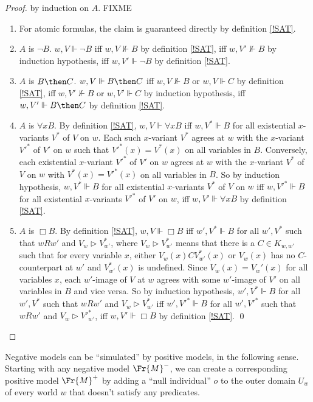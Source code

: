 \documentclass[11pt]{woarticle}
\theoremstyle{break}
\theoremstyle{nonumberplain}
\newcommand{\SAT}{\Vdash}
\newcommand{\Img}{\triangleright}
\newcommand{\1}{\;\,|\;\,}
\begin{document}
\begin{proof}
  by induction on $A$. 
  FIXME
  \begin{enumerate}
  \item For atomic formulas, the claim is guaranteed directly by
    definition \ref{!SAT}.
  \item $A$ is $\neg B$.\; $w,V \SAT \neg B$ iff $w,V \not\SAT B$ by
    definition \ref{!SAT}, iff $w,V' \not\SAT B$ by induction
    hypothesis, iff $w,V' \SAT \neg B$ by definition \ref{!SAT}.
  \item $A$ is $B \then C$.\; $w,V \SAT B \then C$ iff $w,V \not\SAT
    B$ or $w,V \SAT C$ by definition \ref{!SAT}, iff $w,V' \not\SAT B$
    or $w,V' \SAT C$ by induction hypothesis, iff $w,V' \SAT B \then
    C$ by definition \ref{!SAT}.
  \item $A$ is $\forall x B$.\; By definition \ref{!SAT}, $w,V \SAT
    \forall x B$ iff $w,V^* \SAT B$ for all existential $x$-variants
    $V^*$ of $V$ on $w$. Each such $x$-variant $V^*$ agrees at $w$
    with the $x$-variant ${V'}^*$ of $V'$ on $w$ such that ${V'}^*(x)
    = V^*(x)$ on all variables in $B$. Conversely, each existential
    $x$-variant ${V'}^*$ of $V'$ on $w$ agrees at $w$ with the
    $x$-variant $V^*$ of $V$ on $w$ with $V^*(x) = {V'}^*(x)$ on all
    variables in $B$. So by induction hypothesis, $w,V^* \SAT B$ for
    all existential $x$-variants $V^*$ of $V$ on $w$ iff $w,{V'}^*
    \SAT B$ for all existential $x$-variants ${V'}^*$ of $V'$ on $w$,
    iff $w,V' \SAT \forall x B$ by definition \ref{!SAT}.
  \item $A$ is $\Box B$.\; By definition \ref{!SAT}, $w,V \SAT \Box B$
    iff $w',V^* \SAT B$ for all $w',V^*$ such that $wRw'$ and $V_w\Img
    V^*_{w'}$, where $V_w\Img V^*_{w'}$ means that there is a $C \in
    K_{w,w'}$ such that for every variable $x$, either
    $V_w(x)CV_{w'}^*(x)$ or $V_w(x)$ has no $C$-counterpart at $w'$
    and $V_{w'}^*(x)$ is undefined. Since $V_w(x) = V_w'(x)$ for all
    variables $x$, each $w'$-image of $V$ at $w$ agrees with some
    $w'$-image of $V'$ on all variables in $B$ and vice versa. So by
    induction hypothesis, $w',V^* \SAT B$ for all $w',V^*$ such that
    $wRw'$ and $V_w \Img V^*_{w'}$ iff $w',{V'}^* \SAT B$ for all
    $w',{V'}^*$ such that $wRw'$ and $V_w \Img {V'}^*_{w'}$, iff $w,V'
    \SAT \Box B$ by definition \ref{!SAT}. \qed
  \end{enumerate}
\end{proof}

Negative models can be ``simulated'' by positive models, in the following sense.
Starting with any negative model $\Fr{M}^{-}$, we can create a corresponding
positive model $\Fr{M}^{+}$ by adding a ``null individual'' $o$ to the outer
domain $U_w$ of every world $w$ that doesn't satisfy any predicates.
\end{document}
